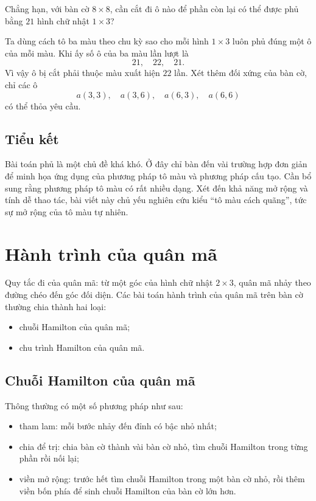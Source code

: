 \documentclass[11pt]{article}
\begin{document}
Chẳng hạn, với bàn cờ \(8\times8\), cần cắt đi ô nào để phần còn lại có thể
được phủ bằng \(21\) hình chữ nhật \(1\times3\)?

Ta dùng cách tô ba màu theo chu kỳ sao cho mỗi hình \(1\times3\) luôn phủ
đúng một ô của mỗi màu. Khi ấy số ô của ba màu lần lượt là
\[
  21,\quad 22,\quad 21.
\]
Vì vậy ô bị cắt phải thuộc màu xuất hiện \(22\) lần. Xét thêm đối xứng của
bàn cờ, chỉ các ô
\[
  a(3,3),\quad a(3,6),\quad a(6,3),\quad a(6,6)
\]
có thể thỏa yêu cầu.

\subsection{Tiểu kết}

Bài toán phủ là một chủ đề khá khó. Ở đây chỉ bàn đến vài trường hợp đơn giản
để minh họa ứng dụng của phương pháp tô màu và phương pháp cấu tạo. Cần bổ
sung rằng phương pháp tô màu có rất nhiều dạng. Xét đến khả năng mở rộng và
tính dễ thao tác, bài viết này chủ yếu nghiên cứu kiểu ``tô màu cách quãng'',
tức sự mở rộng của tô màu tự nhiên.

\section{Hành trình của quân mã}

Quy tắc đi của quân mã: từ một góc của hình chữ nhật \(2\times3\), quân mã
nhảy theo đường chéo đến góc đối diện. Các bài toán hành trình của quân mã
trên bàn cờ thường chia thành hai loại:
\begin{itemize}
  \item chuỗi Hamilton của quân mã;
  \item chu trình Hamilton của quân mã.
\end{itemize}

\subsection{Chuỗi Hamilton của quân mã}

Thông thường có một số phương pháp như sau:
\begin{itemize}
  \item tham lam: mỗi bước nhảy đến đỉnh có bậc nhỏ nhất;
  \item chia để trị: chia bàn cờ thành vài bàn cờ nhỏ, tìm chuỗi Hamilton
        trong từng phần rồi nối lại;
  \item viền mở rộng: trước hết tìm chuỗi Hamilton trong một bàn cờ nhỏ, rồi
        thêm viền bốn phía để sinh chuỗi Hamilton của bàn cờ lớn hơn.
\end{itemize}
\end{document}
